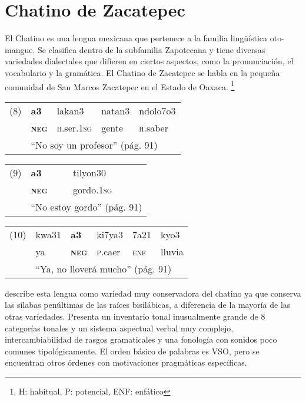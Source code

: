 \section*{Chatino de Zacatepec}

\noindent El Chatino es una lengua mexicana que pertenece a la familia lingüística oto-mangue. Se clasifica dentro de la subfamilia Zapotecana y tiene diversas variedades dialectales que difieren en ciertos aspectos, como la pronunciación, el vocabulario y la gramática. El Chatino de Zacatepec se habla en la pequeña comunidad de San Marcos Zacatepec en el Estado de Oaxaca. \vspace{1cm} %
\footnote{H: habitual, P: potencial, ENF: enfático}

{\setmainfont{Charis SIL}

\begin{tabular}{lllll}
(8) & \textbf{a3} & lakan3 & natan3 & ndolo7o3 \\
& \textsc{\textbf{neg}} & \textsc{h}.ser.\textsc{1sg} & gente & \textsc{h}.saber \\
& \multicolumn{4}{l}{“No soy un profesor” (pág. 91)}
\end{tabular} \vspace{0.5cm}

\begin{tabular}{lll}
(9) & \textbf{a3} & tilyon30 \\
& \textsc{\textbf{neg}} & gordo.\textsc{1sg} \\
& \multicolumn{2}{l}{“No estoy gordo” (pág. 91)} \\
\end{tabular} \vspace{0.5cm}

\begin{tabular}{llllll}
(10) & kwa31 & \textbf{a3} & ki7ya3 & 7a21 & kyo3 \\
& ya & \textsc{\textbf{neg}} & \textsc{p}.caer & \textsc{enf} & lluvia \\
& \multicolumn{5}{l}{“Ya, no lloverá mucho” (pág. 91)}                
\end{tabular} \vspace{1cm}

} 

\textcolor{MidnightBlue}{\citet{chatino}} describe esta lengua como variedad muy conservadora del chatino ya que conserva las sílabas penúltimas de las raíces bisilábicas, a diferencia de la mayoría de las otras variedades. Presenta un inventario tonal inusualmente grande de 8 categorías tonales y un sistema aspectual verbal muy complejo, intercambiabilidad de rasgos gramaticales y una fonología con sonidos poco comunes tipológicamente. El orden básico de palabras es VSO, pero se encuentran otros órdenes con motivaciones pragmáticas específicas.

